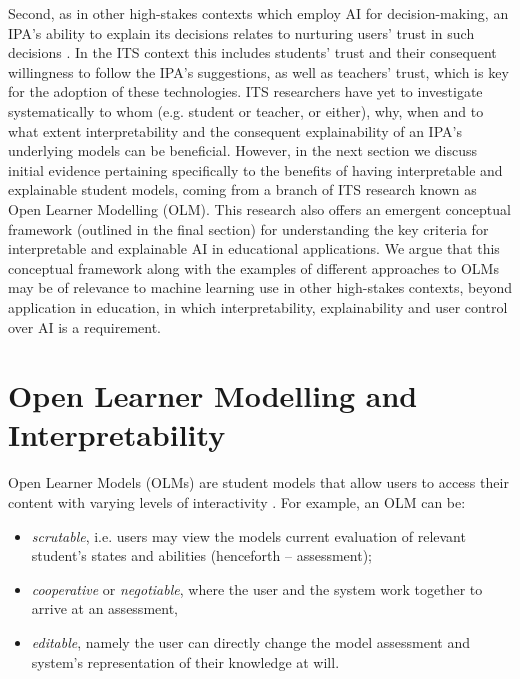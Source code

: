 \documentclass{article}
\begin{document}
Second, as in other high-stakes contexts which employ AI for decision-making, an IPA's ability to explain its decisions relates to nurturing users' trust in such decisions \citep[e.g.,][]{MLinHCI2017}. In the ITS context this includes students' trust and their consequent willingness to follow the IPA's suggestions, as well as teachers' trust, which is key for the adoption of these technologies.  ITS researchers have yet to investigate systematically to whom (e.g. student or teacher, or either), why, when and to what extent interpretability and the consequent explainability of an IPA's underlying models can be beneficial. However, in the next section we discuss initial evidence pertaining specifically to the benefits of having interpretable and explainable student models, coming from a branch of ITS research known as Open Learner Modelling (OLM). This research also offers an emergent conceptual framework (outlined in the final section) for understanding the key criteria for interpretable and explainable AI in educational applications. We argue that this conceptual framework along with the examples of different approaches to OLMs may be of relevance to machine learning use in other high-stakes contexts, beyond application in education, in which interpretability, explainability and user control over AI is a requirement.

\section{Open Learner Modelling and Interpretability}

Open Learner Models (OLMs) are student models that allow users to access their content with varying levels of interactivity \cite{Bull1995,Bull2016}. For example, an OLM can be:

\begin{itemize}
\item \emph{scrutable}, i.e. users may view the models current evaluation of relevant student's states and abilities (henceforth -- assessment); 
\item \emph{cooperative} or \emph{negotiable}, where the user and the system work together to arrive at an assessment, 
\item \emph{editable}, namely the user can directly change the model assessment and system's representation of their knowledge at will.
\end{itemize}
\end{document}

